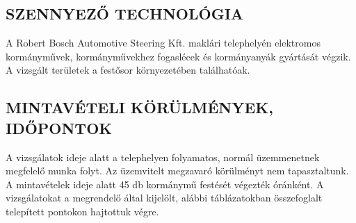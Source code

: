\documentclass[a4paper,12pt]{article}
\begin{document}
	\subsection{SZENNYEZŐ TECHNOLÓGIA}
		\begin{adjustwidth}{1cm}{0cm}
			A Robert Bosch Automotive Steering Kft. maklári telephelyén elektromos kormányművek,
			kormányművekhez fogaslécek és kormányanyák gyártását végzik. A vizsgált területek a
			festősor környezetében találhatóak.
			
		\end{adjustwidth}
	
	\subsection{MINTAVÉTELI KÖRÜLMÉNYEK, IDŐPONTOK}
	\begin{adjustwidth}{1cm}{0cm}
		A vizsgálatok ideje alatt a telephelyen folyamatos, normál üzemmenetnek megfelelő
		munka folyt. Az üzemvitelt megzavaró körülményt nem tapasztaltunk. A mintavételek
		ideje alatt 45 db kormánymű festését végezték óránként. A vizsgálatokat a megrendelő
		által kijelölt, alábbi táblázatokban összefoglalt telepített pontokon hajtottuk végre.
		
	\end{adjustwidth}
	\newpage  %
\end{document}
